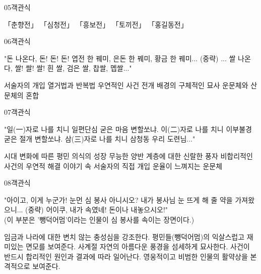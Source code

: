 \documentclass[fs9,seriesRus]{korfarm-base}
\begin{document}
\begin{kfQBlock}{05}{객관식}
\begin{kfChoices}
\kfChoice 「춘향전」
\kfChoice 「심청전」
\kfChoice 「흥보전」
\kfChoice 「토끼전」
\kfChoice 「홍길동전」
\end{kfChoices}
\end{kfQBlock}
\begin{kfQBlock}{06}{객관식}
\begin{kfEvidence}"돈 나온다, 돈! 돈! 돈! 엽전 한 꿰미, 은돈 한 꿰미, 황금 한 꿰미... (중략) ... 쌀 나온다, 쌀! 쌀! 쌀! 흰 쌀, 검은 쌀, 찹쌀, 멥쌀..."\end{kfEvidence}
\begin{kfChoices}
\kfChoice 서술자의 개입
\kfChoice 열거법과 반복법
\kfChoice 우연적인 사건 전개
\kfChoice 배경의 구체적인 묘사
\kfChoice 운문체와 산문체의 혼합
\end{kfChoices}
\end{kfQBlock}
\begin{kfQBlock}{07}{객관식}
\begin{kfEvidence}"일(一)자로 나를 치니 일편단심 굳은 마음 변할쏘냐. 이(二)자로 나를 치니 이부불경 굳은 절개 변할쏘냐. 삼(三)자로 나를 치니 삼청동 우리 도련님..."\end{kfEvidence}
\begin{kfChoices}
\kfChoice 시대 변화에 따른 평민 의식의 성장
\kfChoice 무능한 양반 계층에 대한 신랄한 풍자
\kfChoice 비합리적인 사건의 우연적 해결
\kfChoice 이야기 속 서술자의 직접 개입
\kfChoice 운율이 느껴지는 운문체
\end{kfChoices}
\end{kfQBlock}
\begin{kfQBlock}{08}{객관식}
\begin{kfEvidence}"아이고, 이게 누군가! 눈먼 심 봉사 아니시오? 내가 봉사님 눈 뜨게 해 줄 약을 가져왔으니... (중략) 어이쿠, 내가 속였네! 돈이나 내놓으시오!"   \\\relax
   (이 부분은 '뺑덕어멈'이라는 인물이 심 봉사를 속이는 장면이다.)\end{kfEvidence}
\begin{kfChoices}
\kfChoice 임금과 나라에 대한 변치 않는 충성심을 강조한다.
\kfChoice 평민들(뺑덕어멈)의 익살스럽고 재미있는 면모를 보여준다.
\kfChoice 사계절 자연의 아름다운 풍경을 섬세하게 묘사한다.
\kfChoice 사건이 반드시 합리적인 원인과 결과에 따라 일어난다.
\kfChoice 영웅적이고 비범한 인물의 활약상을 본격적으로 보여준다.
\end{kfChoices}
\end{kfQBlock}
\end{document}
